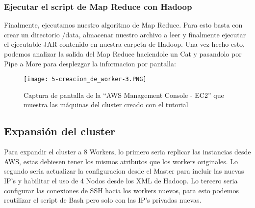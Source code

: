 \documentclass[9pt,letterpaper,twoside]{article}
\begin{document}
\newpage

\subsubsection*{Ejecutar el script de Map Reduce con Hadoop}

Finalmente, ejecutamos nuestro algoritmo de Map Reduce. Para esto basta con crear un directorio /data, almacenar nuestro archivo
a leer y finalmente ejecutar el ejecutable JAR contenido en nuestra carpeta de Hadoop. Una vez hecho esto, podemos analizar la
salida del Map Reduce haciendole un Cat y pasandolo por Pipe a More para desplezgar la informacion por pantalla:

\begin{code}[H]
    
\end{code}

\begin{figure}
    \centering
    \texttt{[image: 5-creacion\_de\_worker-3.PNG]}
    \caption{Captura de pantalla de la ``AWS Management Console - EC2'' que muestra las máquinas del cluster creado con el tutorial}
    \label{5-creacion_de_worker-3.PNG}
\end{figure}

\newpage

\subsection{Expansión del cluster}

\noindent
Para expandir el cluster a 8 Workers, lo primero seria replicar las instancias desde AWS, estas debiesen tener los mismos
atributos que los workers originales. Lo segundo seria actualizar la configuracion desde el Master para incluir las nuevas
IP's y habilitar el uso de 4 Nodos desde los XML de Hadoop. Lo tercero seria configurar las conexiones de SSH hacia los workers
nuevos, para esto podemos reutilizar el script de Bash pero solo con las IP's privadas nuevas.

\begin{code}[H]
    
\end{code}

\newpage
\end{document}
